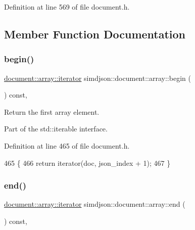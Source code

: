 Definition at line 569 of file document.\+h.



\subsection{Member Function Documentation}
\mbox{\label{classsimdjson_1_1document_1_1array_ad5c3c380c55098b2266a311369819b8c}} 
\subsubsection{\texorpdfstring{begin()}{begin()}}
{\footnotesize\ttfamily \hyperlink{classsimdjson_1_1document_1_1array_1_1iterator}{document\+::array\+::iterator} simdjson\+::document\+::array\+::begin (\begin{DoxyParamCaption}{ }\end{DoxyParamCaption}) const\hspace{0.3cm}{\ttfamily [inline]}, {\ttfamily [noexcept]}}



Return the first array element. 

Part of the std\+::iterable interface. 

Definition at line 465 of file document.\+h.


\begin{DoxyCode}
465                                                                  \{
466   \textcolor{keywordflow}{return} iterator(doc, json\_index + 1);
467 \}
\end{DoxyCode}
\mbox{\label{classsimdjson_1_1document_1_1array_ab63f33e3cf8283595472fe6e1325ced8}} 
\subsubsection{\texorpdfstring{end()}{end()}}
{\footnotesize\ttfamily \hyperlink{classsimdjson_1_1document_1_1array_1_1iterator}{document\+::array\+::iterator} simdjson\+::document\+::array\+::end (\begin{DoxyParamCaption}{ }\end{DoxyParamCaption}) const\hspace{0.3cm}{\ttfamily [inline]}, {\ttfamily [noexcept]}}



